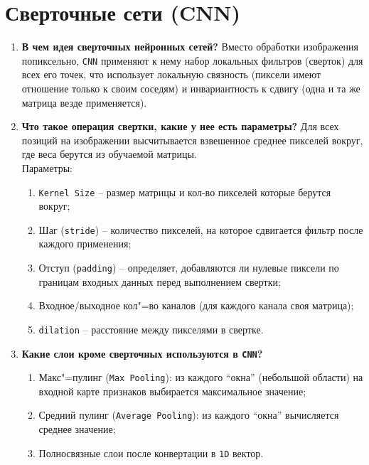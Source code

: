 \documentclass{article}
\begin{document}
\section{Сверточные сети (CNN)}
\begin{enumerate}
    \item \textbf{В чем идея сверточных нейронных сетей?} Вместо обработки изображения попиксельно, \texttt{CNN} применяют к нему набор локальных фильтров (сверток) для всех его точек, что использует локальную связность (пиксели имеют отношение только к своим соседям) и инвариантность к сдвигу (одна и та же матрица везде применяется).
    \item \textbf{Что такое операция свертки, какие у нее есть параметры?} Для всех позиций на изображении высчитывается взвешенное среднее пикселей вокруг, где веса берутся из обучаемой матрицы. \\ Параметры: 
    \begin{enumerate}
        \item \texttt{Kernel Size} -- размер матрицы и кол-во пикселей которые берутся вокруг; 
        \item Шаг (\texttt{stride}) -- количество пикселей, на которое сдвигается фильтр после каждого применения; 
        \item Отступ (\texttt{padding}) -- определяет, добавляются ли нулевые пиксели по границам входных данных перед выполнением свертки; 
        \item Входное/выходное кол"=во каналов (для каждого канала своя матрица); 
        \item \texttt{dilation} -- расстояние между пикселями в свертке.
    \end{enumerate}
    \item \textbf{Какие слои кроме сверточных используются в \texttt{CNN}?} 
    \begin{enumerate}
        \item Макс"=пулинг (\texttt{Max Pooling}): из каждого ``окна'' (небольшой области) на входной карте признаков выбирается максимальное значение; 
        \item Средний пулинг (\texttt{Average Pooling}): из каждого ``окна'' вычисляется среднее значение; 
        \item Полносвязные слои после конвертации в \texttt{1D} вектор.
    \end{enumerate}

\end{enumerate}
\end{document}
